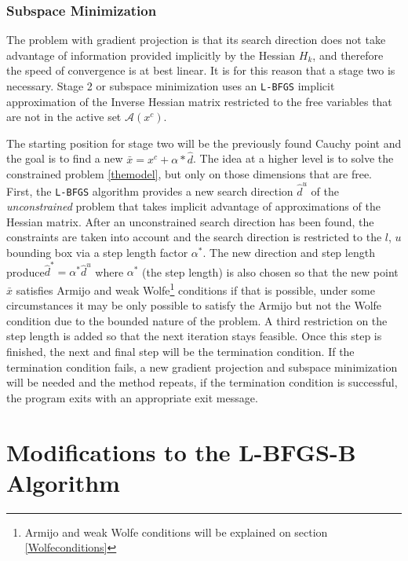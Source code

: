 \subsection{Subspace Minimization}

The problem with gradient projection is that its search direction does not take advantage of information provided implicitly by the Hessian $H_k$, and therefore the speed of convergence is at best linear. It is for this reason that a stage two is necessary. Stage 2 or subspace minimization uses an \texttt{L-BFGS} implicit approximation of the Inverse Hessian matrix restricted to the free variables that are not in the active set $\mathcal{A}(x^c)$.

The starting position for stage two will be the previously found Cauchy point and the goal is to find a new $\bar{x} = x^c + \alpha * \hat{d}$. The idea at a higher level is to solve the constrained problem \eqref{themodel}, but only on those dimensions that are free. First, the \texttt{L-BFGS} algorithm provides a new search direction $\hat{d}^u$ of the \emph{unconstrained} problem that takes implicit advantage of approximations of the Hessian matrix. After an unconstrained search direction has been found, the constraints are taken into account and the search direction is restricted to the $l$, $u$ bounding box via a step length factor $\alpha^*$. The new direction and step length produce$\hat{d}^* = \alpha^* \hat{d}^u$ where $\alpha^*$ (the step length) is also chosen so that the new point $\bar{x}$ satisfies Armijo and weak Wolfe\footnote{Armijo and weak Wolfe conditions will be explained on section \eqref{Wolfeconditions}} conditions if that is possible, under some circumstances it may be only possible to satisfy the Armijo but not the Wolfe condition due to the bounded nature of the problem. A third restriction on the step length is added so that the next iteration stays feasible. Once this step is finished, the next and final step will be the termination condition. If the termination condition fails, a new gradient projection and subspace minimization will be needed and the method repeats, if the termination condition is successful, the program exits with an appropriate exit message.

\chapter{Modifications to the L-BFGS-B Algorithm}

